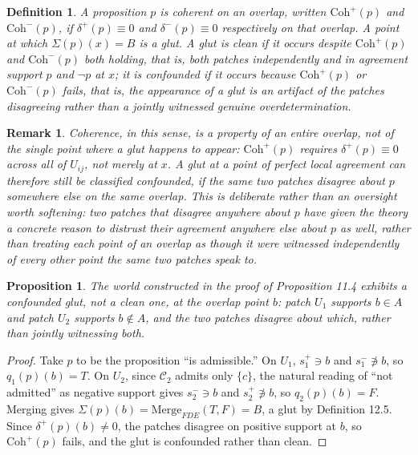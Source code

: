\documentclass[11pt]{book}
\newtheorem{definition}[theorem]{Definition}
\newtheorem{proposition}[theorem]{Proposition}
\newtheorem{remark}[theorem]{Remark}
\begin{document}
\begin{definition}
A proposition $p$ is \emph{coherent} on an overlap, written $\mathrm{Coh}^+(p)$ and $\mathrm{Coh}^-(p)$, if $\delta^+(p) \equiv 0$ and $\delta^-(p) \equiv 0$ respectively on that overlap. A point at which $\Sigma(p)(x) = B$ is a \emph{glut}. A glut is \emph{clean} if it occurs despite $\mathrm{Coh}^+(p)$ and $\mathrm{Coh}^-(p)$ both holding, that is, both patches independently and in agreement support $p$ and $\neg p$ at $x$; it is \emph{confounded} if it occurs because $\mathrm{Coh}^+(p)$ or $\mathrm{Coh}^-(p)$ fails, that is, the appearance of a glut is an artifact of the patches disagreeing rather than a jointly witnessed genuine overdetermination.
\end{definition}

\begin{remark}
Coherence, in this sense, is a property of an entire overlap, not of the single point where a glut happens to appear: $\mathrm{Coh}^+(p)$ requires $\delta^+(p) \equiv 0$ across all of $U_{ij}$, not merely at $x$. A glut at a point of perfect local agreement can therefore still be classified confounded, if the same two patches disagree about $p$ somewhere else on the same overlap. This is deliberate rather than an oversight worth softening: two patches that disagree anywhere about $p$ have given the theory a concrete reason to distrust their agreement anywhere else about $p$ as well, rather than treating each point of an overlap as though it were witnessed independently of every other point the same two patches speak to.
\end{remark}

\begin{proposition}
The world constructed in the proof of Proposition 11.4 exhibits a confounded glut, not a clean one, at the overlap point $b$: patch $U_1$ supports $b \in A$ and patch $U_2$ supports $b \notin A$, and the two patches disagree about which, rather than jointly witnessing both.
\end{proposition}

\begin{proof}
Take $p$ to be the proposition ``is admissible.'' On $U_1$, $s_1^+ \ni b$ and $s_1^- \not\ni b$, so $q_1(p)(b) = T$. On $U_2$, since $\mathcal C_2$ admits only $\{c\}$, the natural reading of ``not admitted'' as negative support gives $s_2^- \ni b$ and $s_2^+ \not\ni b$, so $q_2(p)(b) = F$. Merging gives $\Sigma(p)(b) = \mathrm{Merge}_{FDE}(T, F) = B$, a glut by Definition 12.5. Since $\delta^+(p)(b) \neq 0$, the patches disagree on positive support at $b$, so $\mathrm{Coh}^+(p)$ fails, and the glut is confounded rather than clean.
\end{proof}
\end{document}
